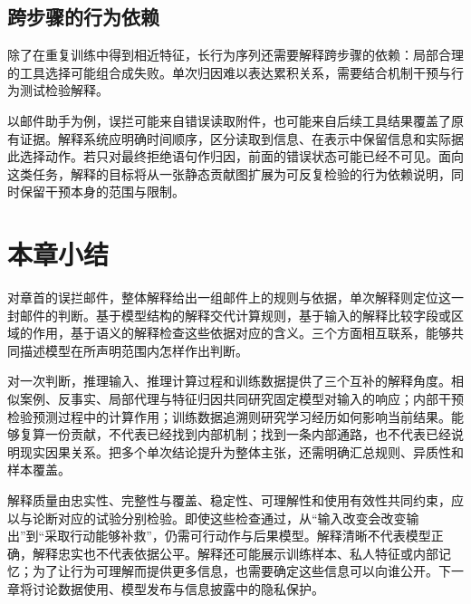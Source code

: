 \subsection{跨步骤的行为依赖}

除了在重复训练中得到相近特征，长行为序列还需要解释跨步骤的依赖：局部合理的工具选择可能组合成失败。单次归因难以表达累积关系，需要结合机制干预与行为测试检验解释。

以邮件助手为例，误拦可能来自错误读取附件，也可能来自后续工具结果覆盖了原有证据。解释系统应明确时间顺序，区分读取到信息、在表示中保留信息和实际据此选择动作。若只对最终拒绝语句作归因，前面的错误状态可能已经不可见。面向这类任务，解释的目标将从一张静态贡献图扩展为可反复检验的行为依赖说明，同时保留干预本身的范围与限制。

\section{本章小结}
\label{sec:interpretability-summary}

对章首的误拦邮件，整体解释给出一组邮件上的规则与依据，单次解释则定位这一封邮件的判断。基于模型结构的解释交代计算规则，基于输入的解释比较字段或区域的作用，基于语义的解释检查这些依据对应的含义。三个方面相互联系，能够共同描述模型在所声明范围内怎样作出判断。

对一次判断，推理输入、推理计算过程和训练数据提供了三个互补的解释角度。相似案例、反事实、局部代理与特征归因共同研究固定模型对输入的响应；内部干预检验预测过程中的计算作用；训练数据追溯则研究学习经历如何影响当前结果。能够复算一份贡献，不代表已经找到内部机制；找到一条内部通路，也不代表已经说明现实因果关系。把多个单次结论提升为整体主张，还需明确汇总规则、异质性和样本覆盖。

解释质量由忠实性、完整性与覆盖、稳定性、可理解性和使用有效性共同约束，应以与论断对应的试验分别检验。即使这些检查通过，从“输入改变会改变输出”到“采取行动能够补救”，仍需可行动作与后果模型。解释清晰不代表模型正确，解释忠实也不代表依据公平。解释还可能展示训练样本、私人特征或内部记忆；为了让行为可理解而提供更多信息，也需要确定这些信息可以向谁公开。下一章将讨论数据使用、模型发布与信息披露中的隐私保护。
